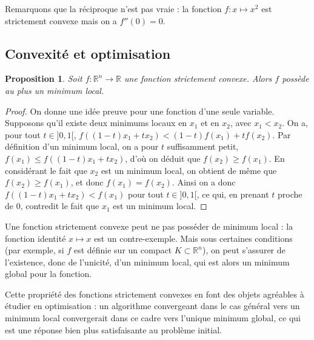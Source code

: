 \documentclass[a4paper]{book}
\newtheorem{proposition}{Proposition}
\newtheorem{proof}{Preuve}
\newcommand{\Rr}{\mathbb{R}}
\begin{document}
Remarquons que la réciproque n'est pas vraie : la fonction $f : x \mapsto x^2$ est strictement convexe mais on a $f''(0)=0$.

\subsection{Convexité et optimisation}

\begin{proposition}
Soit $f : \Rr^n \to \Rr$ une fonction strictement convexe. Alors $f$ possède au plus un minimum local.
\end{proposition}

\begin{proof}
On donne une idée preuve pour une fonction d'une seule variable. Supposons qu'il existe deux minimums locaux en $x_1$ et en $x_2$, avec $x_1<x_2$. On a, pour tout $t \in ]0,1[$, $f((1-t)x_1+tx_2) < (1-t) f(x_1) + t f(x_2)$. Par définition d'un minimum local, on a pour $t$ suffisamment petit, $f(x_1) \le f((1-t)x_1+tx_2)$, d'où on déduit que $f(x_2) \ge f(x_1)$. En considérant le fait que $x_2$ est un minimum local, on obtient de même que $f(x_2) \ge f(x_1)$, et donc $f(x_1)=f(x_2)$. Ainsi on a donc $f((1-t)x_1+tx_2) < f(x_1)$ pour tout $t \in ]0,1[$, ce qui, en prenant $t$ proche de $0$, contredit le fait que $x_1$ est un minimum local.
\end{proof}

Une fonction strictement convexe peut ne pas posséder de minimum local : la fonction identité $x \mapsto x$ est un contre-exemple. Mais sous certaines conditions (par exemple, si $f$ est définie sur un compact $K \subset \Rr^n$), on peut s'assurer de l'existence, donc de l'unicité, d'un minimum local, qui est alors un minimum global pour la fonction.

\bigskip

Cette propriété des fonctions strictement convexes en font des objets agréables à étudier en optimisation : un algorithme convergeant dans le cas général vers un minimum local convergerait dans ce cadre vers l'unique minimum global, ce qui est une réponse bien plus satisfaisante au problème initial.
\end{document}
